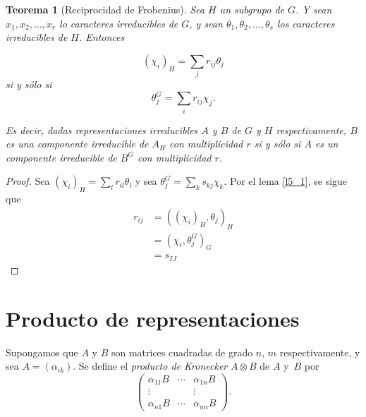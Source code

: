 \documentclass[12pt]{book}
\newtheorem{theorem}{Teorema}[section]
\theoremstyle{definition}
\newcounter{in}
\begin{document}
\begin{theorem}[Reciprocidad de Frobenius]
  \label{t5_3}
  Sea $H$ un subgrupo
  de $G$. Y sean $x_{1}, x_{2},\ldots,x_{r}$ lo caracteres irreducibles
  de $G$, y sean $\theta_{1},\theta_{2},\ldots,\theta_{s}$ los
  caracteres irreducibles de $H$. Entonces

  \begin{equation*}
    (\chi_{i})_{H} = \sum_{j} r_{ij} \theta_{j} 
  \end{equation*}
  si y sólo si 
  \begin{equation*}
    \theta_{j}^{G} = \sum_{i} r_{ij} \chi_{j}.
  \end{equation*}

  Es decir, dadas representaciones irreducibles $A$ y $B$ de $G$ y $H$
  respectivamente, $B$ es una componente irreducible de $A_{H}$ con
  multiplicidad $r$ si y sólo si $A$ es un componente irreducible de
  $B^{G}$ con multiplicidad $r$.
\end{theorem}
\begin{proof}
  Sea $(\chi_{i})_{H} = \sum_{l} r_{il} \theta_{l}$ y sea
  $\theta_{j}^{G} = \sum_{k} s_{kj} \chi_{k}$. Por el lema \ref{l5_1}, se
  sigue que
  \begin{equation}
    \label{eq:66}
    \begin{aligned}
      r_{ij} &= ((\chi_{i})_{H},\theta_{j})_{H} \\
      &= (\chi_{i},\theta_{j}^{G})_{G}\\
      &= s_{IJ}
    \end{aligned}
  \end{equation}
\end{proof}

\section{Producto de representaciones}
\label{sec:pr}

Supongamos que $A$ y $B$ son matrices cuadradas de grado $n$, $m$
respectivamente, y sea $A=(\alpha_{ik})$. Se define el \emph{producto
  de Kronecker} $A \otimes B$ de $A$ y~$B$ por
\begin{equation}
  \label{eq:65}
    \begin{pmatrix}
    \alpha_{11}B & \cdots & \alpha_{1n}B \\ 
    \vdots &  & \vdots \\
    \alpha_{n1}B & \cdots & \alpha_{nn}B
  \end{pmatrix}.
\end{equation}
\end{document}
